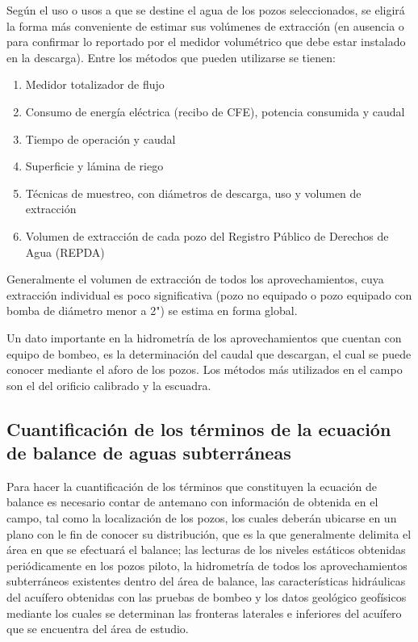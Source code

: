 Según el uso o usos a que se destine el agua de los pozos seleccionados, se eligirá la forma más conveniente de estimar sus volúmenes de extracción (en ausencia o para confirmar lo reportado por el medidor volumétrico que debe estar instalado en la descarga). Entre los métodos que pueden utilizarse se tienen:
\begin{enumerate}
    \item Medidor totalizador de flujo
    \item Consumo de energía eléctrica (recibo de CFE), potencia consumida y caudal
    \item Tiempo de operación y caudal
    \item Superficie y lámina de riego
    \item Técnicas de muestreo, con diámetros de descarga, uso y volumen de extracción
    \item Volumen de extracción de cada pozo del Registro Público de Derechos de Agua (REPDA)
\end{enumerate}
Generalmente el volumen de extracción de todos los aprovechamientos, cuya extracción individual es poco significativa (pozo no equipado o pozo equipado con bomba de diámetro menor a 2") se estima en forma global.

Un dato importante en la hidrometría de los aprovechamientos que cuentan con equipo de bombeo, es la determinación del caudal que descargan, el cual se puede conocer mediante el aforo de los pozos. Los métodos más utilizados en el campo son el del orificio calibrado y la escuadra.

\subsection{Cuantificación de los términos de la ecuación de balance de aguas subterráneas}

Para hacer la cuantificación de los términos que constituyen la ecuación de balance es necesario contar de antemano con información de obtenida en el campo, tal como la localización de los pozos, los cuales deberán ubicarse en un plano con le fin de conocer su distribución, que es la que generalmente delimita el área en que se efectuará el balance; las lecturas de los niveles estáticos obtenidas periódicamente en los pozos piloto, la hidrometría de todos los aprovechamientos subterráneos existentes dentro del área de balance, las características hidráulicas del acuífero obtenidas con las pruebas de bombeo y los datos geológico geofísicos mediante los cuales se determinan las fronteras laterales e inferiores del acuífero que se encuentra del área de estudio.

